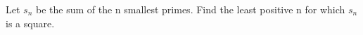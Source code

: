 Let $s_n$ be the sum of the n smallest primes. Find the least positive n for which $s_n$ is a square.
